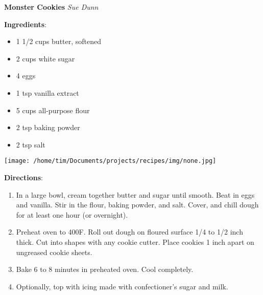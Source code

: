 \documentclass[11pt, twoside, openany]{book}
\begin{document}
\noindent\begin{minipage}[t]{\linewidth}%
{\Large\textbf{Monster Cookies}} \label{monster-cookies}\hfill\textit{Sue Dunn}\\
\noindent\begin{minipage}[t]{0.78\linewidth}%
\textbf{Ingredients}:\vspace{-3mm}
\begin{multicols}{2}
\begin{itemize}\setlength\itemsep{-1mm}
\item 1 1/2 cups butter, softened
\item 2 cups white sugar
\item 4 eggs
\item 1 tsp vanilla extract
\item 5 cups all-purpose flour
\item 2 tsp baking powder
\item 2 tsp salt
\end{itemize}
\end{multicols}
\end{minipage}
\noindent\begin{minipage}[t]{0.18\linewidth}
\centering \strut\vspace*{-\baselineskip}\newline
\texttt{[image: /home/tim/Documents/projects/recipes/img/none.jpg]}\\
\end{minipage}\vspace{3mm}
\textbf{Directions}:
\vspace{-3mm}\begin{enumerate}\setlength\itemsep{-1mm}
\item In a large bowl, cream together butter and sugar until smooth. Beat in eggs and vanilla. Stir in the flour, baking powder, and salt. Cover, and chill dough for at least one hour (or overnight).
\item Preheat oven to 400F. Roll out dough on floured surface 1/4 to 1/2 inch thick. Cut into shapes with any cookie cutter. Place cookies 1 inch apart on ungreased cookie sheets.
\item Bake 6 to 8 minutes in preheated oven. Cool completely.
\item Optionally, top with icing made with confectioner's sugar and milk.
\end{enumerate}
\end{minipage}\vspace{8mm}
\end{document}
